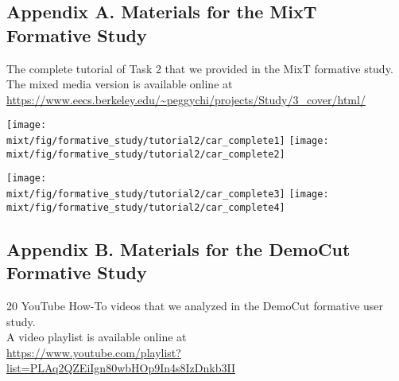 \begin{appendices}

\setcounter{figure}{0}
\setcounter{table}{0}



\subsection{Appendix A. Materials for the MixT Formative Study}
\label{mixt_formative_tutorial2}

The complete tutorial of Task 2 that we provided in the MixT formative study.\\
The mixed media version is available online at\\
\url{https://www.eecs.berkeley.edu/~peggychi/projects/Study/3_cover/html/}

\vspace{20pt}
\texttt{[image: \\mixt/fig/formative\_study/tutorial2/car\_complete1]}
\texttt{[image: \\mixt/fig/formative\_study/tutorial2/car\_complete2]}

\clearpage

\texttt{[image: \\mixt/fig/formative\_study/tutorial2/car\_complete3]}
\texttt{[image: \\mixt/fig/formative\_study/tutorial2/car\_complete4]}

\clearpage


\subsection{Appendix B. Materials for the DemoCut Formative Study}
\label{democut_formative}

20 YouTube How-To videos that we analyzed in the DemoCut formative user study.\\
A video playlist is available online at\\
\url{https://www.youtube.com/playlist?list=PLAq2QZEiIgn80wbHOp9In4s8IzDnkb3II}


\end{appendices}
